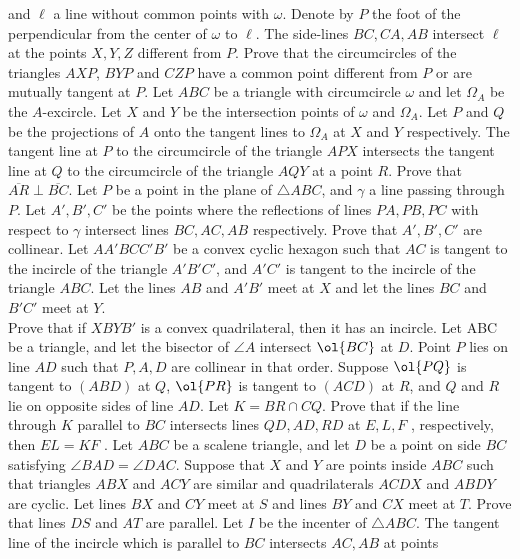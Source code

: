 \documentclass{seto}
\begin{document}
and $\ell$ a line without common points with $\omega$. Denote by $P$ the foot of
the perpendicular from the center of $\omega$ to $\ell$. The side-lines
$BC,CA,AB$ intersect $\ell$ at the points $X,Y,Z$ different from $P$. Prove that
the circumcircles of the triangles $AXP$, $BYP$ and $CZP$ have a common point
different from $P$ or are mutually tangent at $P$.
\exercise[Shortlist 2021/G8] Let $ABC$ be a triangle with circumcircle $\omega$
and let $\Omega_A$ be the $A$-excircle. Let $X$ and $Y$ be the intersection
points of $\omega$ and $\Omega_A$. Let $P$ and $Q$ be the projections of $A$
onto the tangent lines to $\Omega_A$ at $X$ and $Y$ respectively. The tangent
line at $P$ to the circumcircle of the triangle $APX$ intersects the tangent
line at $Q$ to the circumcircle of the triangle $AQY$ at a point $R$. Prove that
$\overline{AR} \perp \overline{BC}$.
\exercise[USAMO 2012/5] Let $P$ be a point in the plane of $\triangle ABC$, and
$\gamma$ a line passing through $P$. Let $A', B', C'$ be the points where the
reflections of lines $PA, PB, PC$ with respect to $\gamma$ intersect lines $BC,
AC, AB$ respectively. Prove that $A', B', C'$ are collinear.
\exercise[Shortlist 2022/G8] Let $AA'BCC'B'$ be a convex cyclic hexagon such
that $AC$ is tangent to the incircle of the triangle $A'B'C'$, and $A'C'$ is
tangent to the incircle of the triangle $ABC$. Let the lines $AB$ and $A'B'$
meet at $X$ and let the lines $BC$ and $B'C'$ meet at $Y$. \\[3pt]
Prove that if $XBYB'$ is a convex quadrilateral, then it has an incircle.
\exercise[China 2020/2] Let ABC be a triangle, and let the bisector of $\angle
A$ intersect $\ol{BC}$ at $D$. Point $P$ lies on line $AD$ such that $P, A, D$
are collinear in that order. Suppose $\ol{PQ}$ is tangent to $(ABD)$ at $Q$,
$\ol{PR}$ is tangent to $(ACD)$ at $R$, and $Q$ and $R$ lie on opposite sides of
line $AD$. Let $K = BR \cap CQ$. Prove that if the line through $K$ parallel to
$BC$ intersects lines $QD, AD, RD$ at $E, L, F$ , respectively, then $EL = KF$ .
\exercise[TSTST 2024/8] Let $ABC$ be a scalene triangle, and let $D$ be a point
on side $BC$ satisfying $\angle BAD=\angle DAC$. Suppose that $X$ and $Y$ are
points inside $ABC$ such that triangles $ABX$ and $ACY$ are similar and
quadrilaterals $ACDX$ and $ABDY$ are cyclic. Let lines $BX$ and $CY$ meet at $S$
and lines $BY$ and $CX$ meet at $T$. Prove that lines $DS$ and $AT$ are
parallel.
Let $I$ be the incenter of $\triangle ABC$. The tangent
line of the incircle which is parallel to $BC$ intersects $AC,AB$ at points
\end{document}
